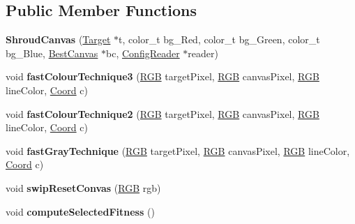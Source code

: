 \subsection*{Public Member Functions}
\begin{DoxyCompactItemize}
\item 
\hypertarget{class_shroud_canvas_a7723ea991bc0b77b24c9480be58c0728}{{\bfseries Shroud\-Canvas} (\hyperlink{class_target}{Target} $\ast$t, color\-\_\-t bg\-\_\-\-Red, color\-\_\-t bg\-\_\-\-Green, color\-\_\-t bg\-\_\-\-Blue, \hyperlink{class_best_canvas}{Best\-Canvas} $\ast$bc, \hyperlink{class_config_reader}{Config\-Reader} $\ast$reader)}\label{class_shroud_canvas_a7723ea991bc0b77b24c9480be58c0728}

\item 
\hypertarget{class_shroud_canvas_a0b43672515fb0e4119e907fc97682d32}{void {\bfseries fast\-Colour\-Technique3} (\hyperlink{struct_r_g_b}{R\-G\-B} target\-Pixel, \hyperlink{struct_r_g_b}{R\-G\-B} canvas\-Pixel, \hyperlink{struct_r_g_b}{R\-G\-B} line\-Color, \hyperlink{struct_coord}{Coord} c)}\label{class_shroud_canvas_a0b43672515fb0e4119e907fc97682d32}

\item 
\hypertarget{class_shroud_canvas_abab815d6a5f9e283f96386e5436bb994}{void {\bfseries fast\-Colour\-Technique2} (\hyperlink{struct_r_g_b}{R\-G\-B} target\-Pixel, \hyperlink{struct_r_g_b}{R\-G\-B} canvas\-Pixel, \hyperlink{struct_r_g_b}{R\-G\-B} line\-Color, \hyperlink{struct_coord}{Coord} c)}\label{class_shroud_canvas_abab815d6a5f9e283f96386e5436bb994}

\item 
\hypertarget{class_shroud_canvas_ade49131d9be44f62153833ef2a276210}{void {\bfseries fast\-Gray\-Technique} (\hyperlink{struct_r_g_b}{R\-G\-B} target\-Pixel, \hyperlink{struct_r_g_b}{R\-G\-B} canvas\-Pixel, \hyperlink{struct_r_g_b}{R\-G\-B} line\-Color, \hyperlink{struct_coord}{Coord} c)}\label{class_shroud_canvas_ade49131d9be44f62153833ef2a276210}

\item 
\hypertarget{class_shroud_canvas_a25f44287b8e52d404ac0a853f2fdd158}{void {\bfseries swip\-Reset\-Convas} (\hyperlink{struct_r_g_b}{R\-G\-B} rgb)}\label{class_shroud_canvas_a25f44287b8e52d404ac0a853f2fdd158}

\item 
\hypertarget{class_shroud_canvas_a93f699d62ef109a1e8c704f535feec43}{void {\bfseries compute\-Selected\-Fitness} ()}\label{class_shroud_canvas_a93f699d62ef109a1e8c704f535feec43}


\end{DoxyCompactItemize}
